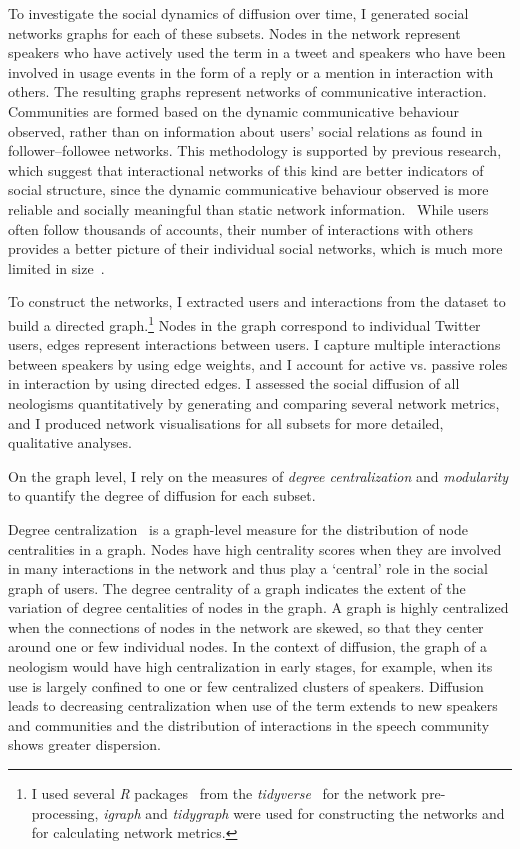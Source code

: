 \documentclass[
  a4paper,
  abstract=on,
  captions=tableabove
  ]{scrartcl}
\begin{document}
  To investigate the social dynamics of diffusion over time, I generated social networks graphs for each of these subsets. Nodes in the network represent speakers who have actively used the term in a tweet and speakers who have been involved in usage events in the form of a reply or a mention in interaction with others. The resulting graphs represent networks of communicative interaction. Communities are formed based on the dynamic communicative behaviour observed, rather than on information about users' social relations as found in follower--followee networks. This methodology is supported by previous research, which suggest that interactional networks of this kind are better indicators of social structure, since the dynamic communicative behaviour observed is more reliable and socially meaningful than static network information.~\parencite{Goel2016SocialDynamics, Huberman2008SocialNetworks} While users often follow thousands of accounts, their number of interactions with others provides a better picture of their individual social networks, which is much more limited in size~\parencite{Dunbar1992NeocortexSize}.

  To construct the networks, I extracted users and interactions from the dataset to build a directed graph.\footnote{I used several \emph{R} packages~\parencite{RCoreTeam2018LanguageEnvironment} from the \emph{tidyverse}~\parencite{Wickham2019WelcomeTidyverse} for the network pre-processing, \emph{igraph} and \emph{tidygraph} were used for constructing the networks and for calculating network metrics.} Nodes in the graph correspond to individual Twitter users, edges represent interactions between users. I capture multiple interactions between speakers by using edge weights, and I account for active vs. passive roles in interaction by using directed edges. I assessed the social diffusion of all neologisms quantitatively by generating and comparing several network metrics, and I produced network visualisations for all subsets for more detailed, qualitative analyses.

  On the graph level, I rely on the measures of \emph{degree centralization} and \emph{modularity} to quantify the degree of diffusion for each subset.

  Degree centralization~\parencite{Freeman1978CentralitySocial} is a graph-level measure for the distribution of node centralities in a graph. Nodes have high centrality scores when they are involved in many interactions in the network and thus play a `central' role in the social graph of users. The degree centrality of a graph indicates the extent of the variation of degree centalities of nodes in the graph. A graph is highly centralized when the connections of nodes in the network are skewed, so that they center around one or few individual nodes. In the context of diffusion, the graph of a neologism would have high centralization in early stages, for example, when its use is largely confined to one or few centralized clusters of speakers. Diffusion leads to decreasing centralization when use of the term extends to new speakers and communities and the distribution of interactions in the speech community shows greater dispersion.
\end{document}
